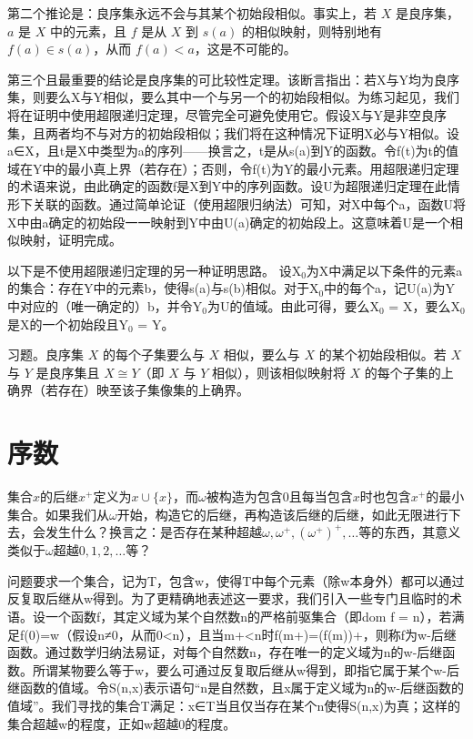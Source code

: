 \documentclass[12pt,a4paper]{ctexbook}
\theoremstyle{definition}
\theoremstyle{remark}
\begin{document}
{第二个推论是：良序集永远不会与其某个初始段相似。事实上，若 \(X\) 是良序集，\(a\) 是 \(X\) 中的元素，且 \(f\) 是从 \(X\) 到 \(s(a)\) 的相似映射，则特别地有 \(f(a) \in s(a)\)，从而 \(f(a) < a\)，这是不可能的。

第三个且最重要的结论是良序集的可比较性定理。该断言指出：若X与Y均为良序集，则要么X与Y相似，要么其中一个与另一个的初始段相似。为练习起见，我们将在证明中使用超限递归定理，尽管完全可避免使用它。假设X与Y是非空良序集，且两者均不与对方的初始段相似；我们将在这种情况下证明X必与Y相似。设a∈X，且t是X中类型为a的序列——换言之，t是从s(a)到Y的函数。令f(t)为t的值域在Y中的最小真上界（若存在）；否则，令f(t)为Y的最小元素。用超限递归定理的术语来说，由此确定的函数f是X到Y中的序列函数。设U为超限递归定理在此情形下关联的函数。通过简单论证（使用超限归纳法）可知，对X中每个a，函数U将X中由a确定的初始段一一映射到Y中由U(a)确定的初始段上。这意味着U是一个相似映射，证明完成。

以下是不使用超限递归定理的另一种证明思路。 设X$_{0}$为X中满足以下条件的元素a的集合：存在Y中的元素b，使得s(a)与s(b)相似。对于X$_{0}$中的每个a，记U(a)为Y中对应的（唯一确定的）b，并令Y$_{0}$为U的值域。由此可得，要么X$_{0}$ = X，要么X$_{0}$是X的一个初始段且Y$_{0}$ = Y。

习题。良序集 \(X\) 的每个子集要么与 \(X\) 相似，要么与 \(X\) 的某个初始段相似。若 \(X\) 与 \(Y\) 是良序集且 \(X \cong Y\)（即 \(X\) 与 \(Y\) 相似），则该相似映射将 \(X\) 的每个子集的上确界（若存在）映至该子集像集的上确界。


\chapter{序数}

集合\(x\)的后继\(x^+\)定义为\(x \cup \{x\}\)，而\(\omega\)被构造为包含0且每当包含\(x\)时也包含\(x^+\)的最小集合。如果我们从\(\omega\)开始，构造它的后继，再构造该后继的后继，如此无限进行下去，会发生什么？换言之：是否存在某种超越\(\omega, \omega^+, (\omega^+)^+, \ldots\)等的东西，其意义类似于\(\omega\)超越\(0, 1, 2, \ldots\)等？

问题要求一个集合，记为T，包含w，使得T中每个元素（除w本身外）都可以通过反复取后继从w得到。为了更精确地表述这一要求，我们引入一些专门且临时的术语。设一个函数f，其定义域为某个自然数n的严格前驱集合（即dom f = n），若满足f(0)=w（假设n≠0，从而0<n），且当m+<n时f(m+)=(f(m))+，则称f为w-后继函数。通过数学归纳法易证，对每个自然数n，存在唯一的定义域为n的w-后继函数。所谓某物要么等于w，要么可通过反复取后继从w得到，即指它属于某个w-后继函数的值域。令S(n,x)表示语句“n是自然数，且x属于定义域为n的w-后继函数的值域”。我们寻找的集合T满足：x∈T当且仅当存在某个n使得S(n,x)为真；这样的集合超越w的程度，正如w超越0的程度。

}
\end{document}
